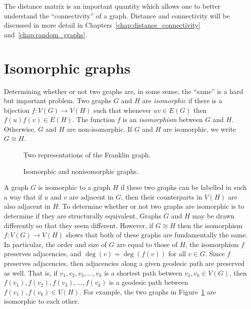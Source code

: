 The distance matrix is an important quantity which allows one to
better understand the ``connectivity'' of a graph. Distance and
connectivity will be discussed in more detail in
Chapters~\ref{chap:distance_connectivity}
and~\ref{chap:random_graphs}.



\section{Isomorphic graphs}
\label{chap:introduction:isomorphic_graphs}

Determining whether or not two graphs are, in some sense, the ``same''
is a hard but important problem. Two graphs $G$ and $H$ are
\emph{isomorphic} if there is a bijection
$f: V(G) \to V(H)$ such that whenever $uv \in E(G)$ then
$f(u) f(v) \in E(H)$. The function $f$ is an
\emph{isomorphism} between $G$ and
$H$. Otherwise, $G$ and $H$ are non-isomorphic. If $G$ and $H$ are
isomorphic, we write $G \cong H$\index{$\cong$}.

\begin{figure}[!htbp]
\centering
{}

\caption{Two representations of the Franklin graph.}
\label{fig:introduction:isomorphic_Franklin_graph}
\end{figure}

\begin{figure}[!htbp]
\centering

\caption{Isomorphic and nonisomorphic graphs.}
\label{fig:introduction:isomorphic_graphs}
\end{figure}

A graph $G$ is isomorphic to a graph $H$ if these two graphs can be
labelled in such a way that if $u$ and $v$ are adjacent in $G$, then
their counterparts in $V(H)$ are also adjacent in $H$. To determine
whether or not two graphs are isomorphic is to determine if they are
structurally equivalent. Graphs $G$ and $H$ may be drawn differently
so that they seem different. However, if $G \cong H$ then the
isomorphism $f: V(G) \to V(H)$ shows that both of these
graphs are fundamentally the same. In particular, the order and size
of $G$ are equal to those of $H$, the isomorphism $f$ preserves
adjacencies, and $\deg(v) = \deg(f(v))$ for all $v \in G$. Since $f$
preserves adjacencies, then adjacencies along a given geodesic path
are preserved as well. That is, if $v_1, v_2, v_3, \dots, v_k$ is a
shortest path between $v_1, v_k \in V(G)$, then
$f(v_1), f(v_2), f(v_3), \dots, f(v_k)$ is a geodesic path between
$f(v_1), f(v_k) \in V(H)$. For example, the two graphs in
Figure~\ref{fig:introduction:isomorphic_Franklin_graph} are isomorphic
to each other.


